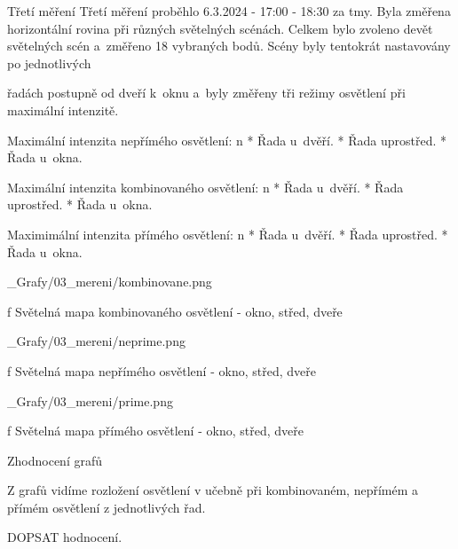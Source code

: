 \sec Třetí měření
Třetí měření proběhlo 6.3.2024 - 17:00 - 18:30 za tmy. Byla změřena horizontální rovina při různých světelných scénách.
Celkem bylo zvoleno devět světelných scén a~změřeno 18 vybraných bodů. Scény byly tentokrát nastavovány po jednotlivých

řadách postupně od dveří k~oknu a~byly změřeny tři režimy osvětlení při maximální intenzitě.\noindent

\medskip\noindent
{\sbf Maximální intenzita nepřímého osvětlení:}
\begitems \style n
    * Řada u~dvěří.
    * Řada uprostřed.
    * Řada u~okna.
\enditems

\medskip\noindent
{\sbf Maximální intenzita kombinovaného osvětlení:}
\begitems \style n
    * Řada u~dvěří.
    * Řada uprostřed.
    * Řada u~okna.
\enditems


\medskip\noindent
{\sbf Maximimální intenzita přímého osvětlení:}
\begitems \style n
    * Řada u~dvěří.
    * Řada uprostřed.
    * Řada u~okna.
\enditems

\medskip {}
\picw=18cm _Grafy/03_mereni/kombinovane.png
\caption/f Světelná mapa kombinovaného osvětlení - okno, střed, dveře
\medskip

\medskip {}
\picw=18cm _Grafy/03_mereni/neprime.png
\caption/f Světelná mapa nepřímého osvětlení - okno, střed, dveře
\medskip

\medskip {}
\picw=18cm _Grafy/03_mereni/prime.png
\caption/f Světelná mapa přímého osvětlení - okno, střed, dveře
\medskip


\medskip\noindent
{\sbf Zhodnocení grafů}

Z grafů vidíme rozložení osvětlení v učebně při kombinovaném, nepřímém a přímém osvětlení z jednotlivých řad.


DOPSAT hodnocení.\noindent




